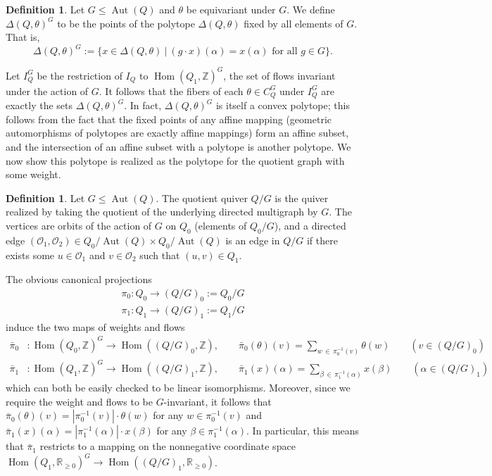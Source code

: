 \documentclass[12pt]{amsart}
\theoremstyle{plain}
\theoremstyle{definition}
\newtheorem{definition}[theorem]{Definition}
\newcommand{\R}{\mathbb{R}}
\newcommand{\Z}{\mathbb{Z}}
\DeclareMathOperator{\aut}{Aut}
\DeclareMathOperator{\Hom}{Hom}
\renewcommand{\hom}{\Hom}
\begin{document}
\begin{definition}
    Let $G \leq \aut(Q)$ and $\theta$ be equivariant under $G$. We define $\Delta(Q, \theta)^G$ to be the points of the polytope $\Delta(Q, \theta)$ fixed by all elements of $G$. That is,
    \[
    \Delta(Q, \theta)^G := \{x \in \Delta(Q, \theta) \:|\: (g \cdot x)(\alpha) = x(\alpha) \text{ for all } g \in G\}.
    \]
\end{definition}

Let $I_Q^G$ be the restriction of $I_Q$ to
$\hom(Q_1, \Z)^G$, the set of flows invariant under the action of $G$. It follows that the fibers of each $\theta \in C_Q^G$ under $I_Q^G$ are exactly the sets $\Delta(Q, \theta)^G$. In fact, $\Delta(Q, \theta)^G$ is itself a convex polytope; this follows from the fact that the fixed points of any affine mapping (geometric automorphisms of polytopes are exactly affine mappings) form an affine subset, and the intersection of an affine subset with a polytope is another polytope. We now show this polytope is realized as the polytope for the quotient graph with some weight.

\begin{definition}
    Let $G \leq \aut(Q)$. The quotient quiver $Q/G$ is the quiver realized by taking the quotient of the underlying directed multigraph by $G$. The vertices are orbits of the action of $G$ on $Q_0$ (elements of $Q_0/G$), and a directed edge $(\mathcal{O}_1, \mathcal{O}_2) \in Q_0/\aut(Q) \times Q_0/\aut(Q)$ is an edge in $Q/G$ if there exists some $u \in \mathcal{O}_1$ and $v \in \mathcal{O}_2$ such that $(u, v) \in Q_1$. 
\end{definition}

The obvious canonical projections 
\begin{align*}
    \pi_0 : Q_0 \longrightarrow (Q/G)_0 := Q_0/G \\
    \pi_1 : Q_1 \longrightarrow (Q/G)_1 := Q_1/G
\end{align*}
induce the two maps of weights and flows
\begin{align*}
    \bar \pi_0 &: \hom(Q_0, \Z)^G \longrightarrow \hom((Q/G)_0, \Z), \qquad \bar\pi_0(\theta)(v) = \sum_{w \,\in\, \pi_0^{-1}(v)}\theta(w) \qquad (v \in (Q/G)_0) \\
    \bar\pi_1 &: \hom(Q_1, \Z)^G \longrightarrow \hom((Q/G)_1, \Z), \qquad \bar\pi_1(x)(\alpha) = \sum_{\beta \,\in\, \pi_1^{-1}(\alpha)}x(\beta) \qquad (\alpha \in (Q/G)_1)
\end{align*}
which can both be easily checked to be linear isomorphisms. Moreover, since we require the weight and flows to be $G$-invariant, it follows that $\bar \pi_0(\theta)(v) = |\pi_0^{-1}(v)| \cdot \theta(w)$ for any $w \in \pi_0^{-1}(v)$ and $\bar\pi_1(x)(\alpha) = |\pi_1^{-1}(\alpha)| \cdot x(\beta)$ for any $\beta \in \pi_1^{-1}(\alpha)$. In particular, this means that $\bar\pi_1$ restricts to a mapping on the nonnegative coordinate space $\hom(Q_1, \R_{\geq 0})^G \longrightarrow \hom((Q/G)_1, \R_{\geq 0})$.
\end{document}
